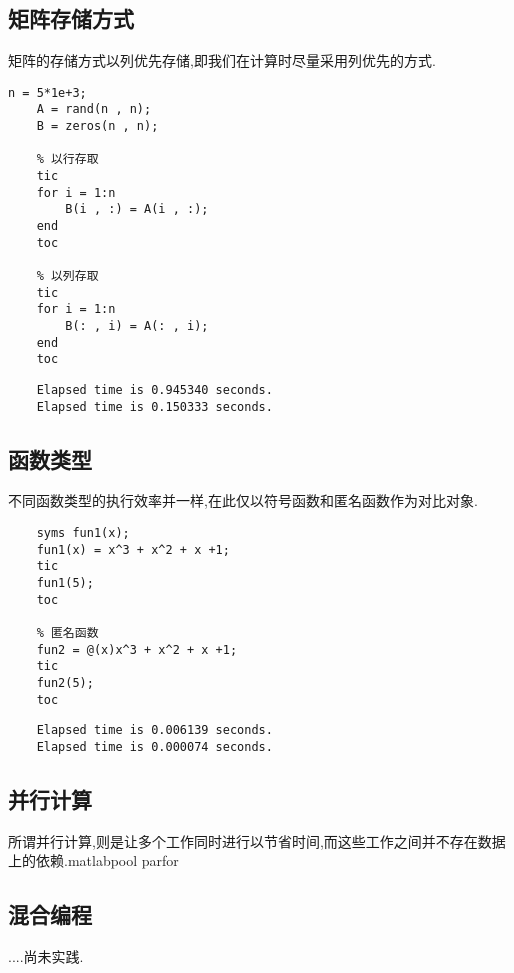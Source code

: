 \subsection{矩阵存储方式}
 矩阵的存储方式以列优先存储,即我们在计算时尽量采用列优先的方式.\\%

  \vspace{-0.8cm}
  \begin{lstlisting}[caption = 矩阵存储的方式]
    n = 5*1e+3;
    A = rand(n , n);
    B = zeros(n , n);

    % 以行存取
    tic
    for i = 1:n
        B(i , :) = A(i , :);
    end
    toc

    % 以列存取
    tic
    for i = 1:n
        B(: , i) = A(: , i);
    end
    toc
  \end{lstlisting}

  \vspace{-0.8cm}
  \begin{lstlisting}
    Elapsed time is 0.945340 seconds.
    Elapsed time is 0.150333 seconds.
  \end{lstlisting}

\subsection{函数类型}
 不同函数类型的执行效率并一样,在此仅以符号函数和匿名函数作为对比对象.

  \vspace{-0.8cm}
  \begin{lstlisting}[caption = 函数类型]
    % 符号函数
    syms fun1(x);
    fun1(x) = x^3 + x^2 + x +1;
    tic
    fun1(5);
    toc

    % 匿名函数
    fun2 = @(x)x^3 + x^2 + x +1;
    tic
    fun2(5);
    toc
  \end{lstlisting}

  \vspace{-0.8cm}
  \begin{lstlisting}
    Elapsed time is 0.006139 seconds.
    Elapsed time is 0.000074 seconds.
  \end{lstlisting}

\subsection{并行计算}
 所谓并行计算,则是让多个工作同时进行以节省时间,而这些工作之间并不存在数据上的依赖.matlabpool parfor

\subsection{混合编程}
 ....尚未实践.